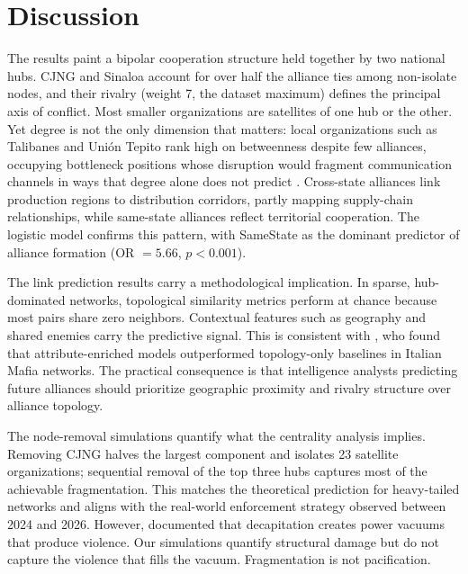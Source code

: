 \documentclass[11pt, a4paper]{article}
\begin{document}
\section{Discussion}\label{sec:discussion}

The results paint a bipolar cooperation structure held together by two national hubs. CJNG and Sinaloa account for over half the alliance ties among non-isolate nodes, and their rivalry (weight 7, the dataset maximum) defines the principal axis of conflict. Most smaller organizations are satellites of one hub or the other. Yet degree is not the only dimension that matters: local organizations such as Talibanes and Uni\'on Tepito rank high on betweenness despite few alliances, occupying bottleneck positions whose disruption would fragment communication channels in ways that degree alone does not predict \citep{duijn2014relative}. Cross-state alliances link production regions to distribution corridors, partly mapping supply-chain relationships, while same-state alliances reflect territorial cooperation. The logistic model confirms this pattern, with SameState as the dominant predictor of alliance formation (OR $= 5.66$, $p < 0.001$).

The link prediction results carry a methodological implication. In sparse, hub-dominated networks, topological similarity metrics perform at chance because most pairs share zero neighbors. Contextual features such as geography and shared enemies carry the predictive signal. This is consistent with \citet{berlusconi2016link}, who found that attribute-enriched models outperformed topology-only baselines in Italian Mafia networks. The practical consequence is that intelligence analysts predicting future alliances should prioritize geographic proximity and rivalry structure over alliance topology.

The node-removal simulations quantify what the centrality analysis implies. Removing CJNG halves the largest component and isolates 23 satellite organizations; sequential removal of the top three hubs captures most of the achievable fragmentation. This matches the theoretical prediction for heavy-tailed networks \citep{albert2000error} and aligns with the real-world enforcement strategy observed between 2024 and 2026. However, \citet{calderon2015beheading} documented that decapitation creates power vacuums that produce violence. Our simulations quantify structural damage but do not capture the violence that fills the vacuum. Fragmentation is not pacification.
\end{document}
